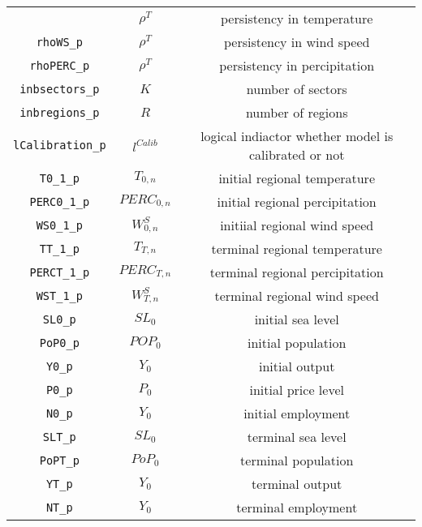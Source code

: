 \begin{center}
\begin{longtable}{ccc}
{\texttt{rhoT\_p} & ${\rho^{T}}$ & persistency in temperature\\
\texttt{rhoWS\_p} & ${\rho^{T}}$ & persistency in wind speed\\
\texttt{rhoPERC\_p} & ${\rho^{T}}$ & persistency in percipitation\\
\texttt{inbsectors\_p} & ${K}$ & number of sectors\\
\texttt{inbregions\_p} & ${R}$ & number of regions\\
\texttt{lCalibration\_p} & ${l^{Calib}}$ & logical indiactor whether model is calibrated or not\\
\texttt{T0\_1\_p} & ${T_{0,n}}$ & initial regional temperature\\
\texttt{PERC0\_1\_p} & ${PERC_{0,n}}$ & initial regional percipitation\\
\texttt{WS0\_1\_p} & ${W^{S}_{0,n}}$ & initiial regional wind speed\\
\texttt{TT\_1\_p} & ${T_{T,n}}$ & terminal regional temperature\\
\texttt{PERCT\_1\_p} & ${PERC_{T,n}}$ & terminal regional percipitation\\
\texttt{WST\_1\_p} & ${W^{S}_{T,n}}$ & terminal regional wind speed\\
\texttt{SL0\_p} & ${SL_0}$ & initial sea level\\
\texttt{PoP0\_p} & ${POP_0}$ & initial population\\
\texttt{Y0\_p} & ${Y_0}$ & initial output\\
\texttt{P0\_p} & ${P_0}$ & initial price level\\
\texttt{N0\_p} & ${Y_0}$ & initial employment\\
\texttt{SLT\_p} & ${SL_0}$ & terminal sea level\\
\texttt{PoPT\_p} & ${PoP_0}$ & terminal population\\
\texttt{YT\_p} & ${Y_0}$ & terminal output\\
\texttt{NT\_p} & ${Y_0}$ & terminal employment\\
\hline%
\end{longtable}
\end{center}

